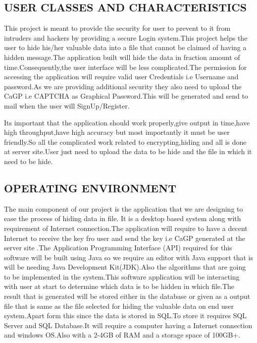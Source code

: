 \documentclass[12pt]{extreport}
\begin{document}
     \subsection{USER CLASSES AND CHARACTERISTICS}
\hspace*{5em}This project is meant to provide the security for user to prevent to it from intruders and hackers by providing a secure Login system.This project helps the user to hide his/her valuable data into a file that cannot be claimed of having a hidden message.The application built will hide the data in fraction amount of time.Consequently,the user interface will be less complicated.The permission for accessing the application will  require valid user Credentials i.e Username and password.As we are providing additional security they also need to upload the CaGP i.e CAPTCHA as Graphical Password.This will be generated and send to mail when the user will SignUp/Register.
	\par Its important that the application should work properly,give output in time,have high throughput,have high accuracy but most importantly it must be user friendly.So all the complicated work related to encrypting,hiding and all is done at server site.User just need to upload the data to be hide and the file in which it need to be hide.

      \subsection{OPERATING ENVIRONMENT}
\hspace*{5em}The main component of our project is the application that we are designing to ease the process of hiding data in file. It is a desktop based system along with requirement of Internet connection.The application will require to have a decent Internet to receive the key fro user and send the key i.e CaGP generated at the server site .The Application Programming Interface (API) required for this software will  be  built using Java so we require an editor with Java support that is  will be needing Java Development Kit(JDK).Also the algorithms that are going to be implemented in the system.This software application will  be interacting  with user at start to determine which data is to be hidden in which file.The result that is generated will be stored either in the database or given as a output file that is same as the file selected for hiding the valuable data on end user system.Apart form this since the data is stored in SQL.To store it requires SQL Server and SQL Database.It will require a computer having a Internet connection and windows OS.Also with a 2-4GB of RAM and a storage space of 100GB+.
\end{document}
